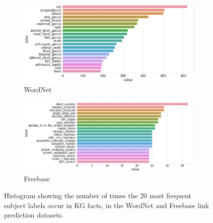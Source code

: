 \begin{figure}
	\begin{subfigure}[b]{.5\linewidth}
   		\centering
    		\includegraphics[width=1.0\linewidth, height=0.6\linewidth]{Wordnet_Subject_Counts}
		\captionsetup{justification=centering}
		\caption{WordNet}
	\end{subfigure}
	\begin{subfigure}[b]{.5\linewidth}
   		\centering
		\includegraphics[width=1.0\linewidth, height=0.6\linewidth]{Freebase_Subject_Counts}
		\captionsetup{justification=centering}
		\caption{Freebase}
	\end{subfigure}
	\captionsetup{justification=centering}
	\caption{Histogram showing the number of times the 20 most frequent subject labels occur in KG facts, in the WordNet and Freebase link prediction datasets.}
\end{figure}





